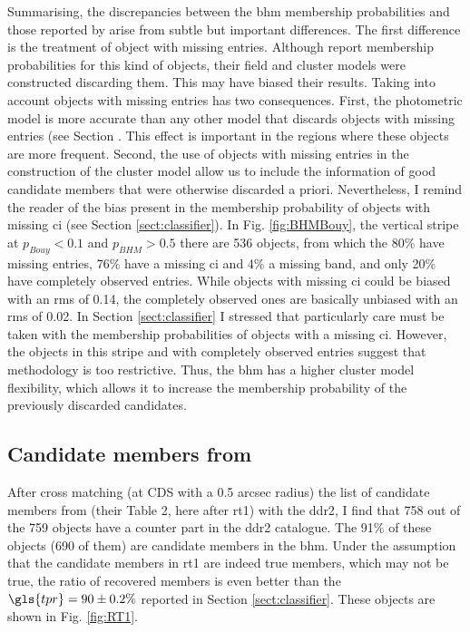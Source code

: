Summarising, the discrepancies between the \gls{bhm} membership probabilities and those reported by \citet{Bouy2015} arise from subtle but important differences. The first difference is the treatment of object with missing entries. Although  \citet{Bouy2015} report membership probabilities for this kind of objects, their field and cluster models were constructed discarding them. This may have biased their results. Taking into account objects with missing entries has two consequences. First, the photometric model is more accurate than any other model that discards objects with missing entries (see Section . This effect is important in the regions where these objects are more frequent. Second, the use of objects with missing entries in the construction of the cluster model allow us to include the information of good candidate members that were otherwise discarded a priori. Nevertheless, I remind the reader of the bias present in the membership probability of objects with missing \gls{ci} (see Section \ref{sect:classifier}). In Fig. \ref{fig:BHMBouy}, the vertical stripe at $p_{Bouy} < 0.1$ and $p_{BHM} > 0.5$ there are 536 objects, from which the 80\% have missing entries, 76\% have a missing \gls{ci} and 4\% a missing band, and only 20\% have completely observed entries. While objects with missing \gls{ci} could be biased with an rms of 0.14, the completely observed ones are basically unbiased with an rms of 0.02. In Section   \ref{sect:classifier} I stressed that particularly care must be taken with the membership probabilities of objects with a missing \gls{ci}. However, the objects in this stripe and with completely observed entries suggest that \citet{Bouy2015} methodology is too restrictive. Thus, the \gls{bhm} has a higher cluster model flexibility, which allows it to increase the membership probability of the previously discarded candidates.

\subsection{Candidate members from \citet{Rebull2016}}
\label{sect:comparisonRebull}

After cross matching (at CDS with a 0.5 arcsec radius) the list of candidate members from \citet{Rebull2016} (their Table 2, here after \gls{rt1}) with the  \gls{ddr2}, I find that 758 out of the 759 objects have a counter part in the \gls{ddr2} catalogue. The 91\% of these objects (690 of them) are candidate members in the \gls{bhm}. Under the assumption that the candidate members in \gls{rt1} are indeed true members, which may not be true, the ratio of recovered members is even better than the $\gls{tpr}=90\pm0.2\%$ reported in Section \ref{sect:classifier}. These objects are shown in Fig. \ref{fig:RT1}.

